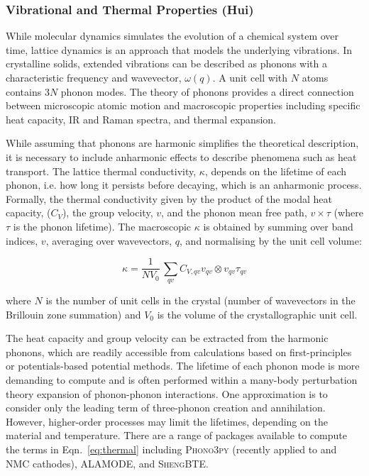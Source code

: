 \documentclass[../main.tex]{subfiles}
\begin{document}
\subsubsection{Vibrational and Thermal Properties (Hui)}
\label{sec:thermal_electronic_vibrational}
While molecular dynamics simulates the evolution of a chemical system over time, lattice dynamics is an approach that models the underlying vibrations. In crystalline solids, extended vibrations can be described as phonons with a characteristic frequency and wavevector, $\omega(q)$. A unit cell with $N$ atoms contains 3$N$ phonon modes. The theory of phonons provides a direct connection between microscopic atomic motion and macroscopic properties including specific heat capacity, IR and Raman spectra, and thermal expansion.\cite{ladd1986lattice, turney2009predicting,seko2015prediction} 

While assuming that phonons are harmonic simplifies the theoretical description, it is necessary to include anharmonic effects to describe phenomena such as heat transport. The lattice thermal conductivity, $\kappa$, depends on the lifetime of each phonon, i.e. how long it persists before decaying, which is an anharmonic process. Formally, the thermal conductivity given by the product of the modal heat capacity, ($C_V$), the group velocity, $v$, and the phonon mean free path, $v \times \tau$ (where $\tau$ is the phonon lifetime). The macroscopic $\kappa$ is obtained by summing over band indices, $v$, averaging over wavevectors, $q$, and normalising by the unit cell volume:

\begin{equation}
    \kappa = \frac{1}{NV_0} \,\sum_{qv} C_{V,qv} v_{qv} \otimes v_{qv} \tau_{qv}
    \label{eq:thermal}
\end{equation}

where $N$ is the number of unit cells in the crystal (number of wavevectors in the Brillouin zone summation) and $V_0$ is the volume of the crystallographic unit cell.

The heat capacity and group velocity can be extracted from the harmonic phonons, which are readily accessible from calculations based on first-principles or potentials-based potential methods. The lifetime of each phonon mode is more demanding to compute and is often performed within a many-body perturbation theory expansion of phonon-phonon interactions. One approximation is to consider only the leading term of three-phonon creation and annihilation. \cite{togo_distributions_2015} However, higher-order processes may limit the lifetimes, depending on the material and temperature. There are a range of packages available to compute the terms in Eqn.~\ref{eq:thermal} including \textsc{Phono3py} \cite{togo_distributions_2015} (recently applied to  and NMC cathodes)\cite{yang2019highly,yang2020chemical}, \textsc{ALAMODE}\cite{tadano2014anharmonic}, and \textsc{ShengBTE}\cite{ShengBTE_2014}.

 
\end{document}
